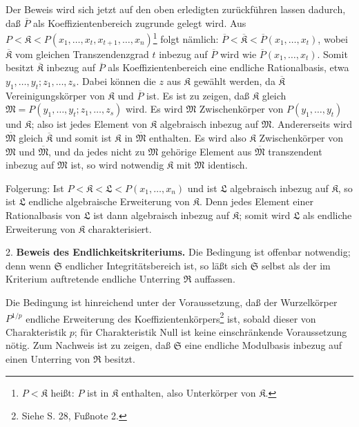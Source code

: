 Der Beweis wird sich jetzt auf den oben erledigten zurückführen lassen dadurch, daß $\overline P$ als Koeffizientenbereich zugrunde gelegt wird. Aus $P<\mathfrak K< P(x_1,\ldots,x_t,x_{t+1},\ldots,x_n)$\footnote{$P<\mathfrak K$ heißt: $P$ ist in $\mathfrak K$ enthalten, also Unterkörper von $\mathfrak K$.} folgt nämlich: $\overline P<\overline{\mathfrak K}<\overline P(x_1,\ldots,x_t)$, wobei $\overline{\mathfrak K}$ vom gleichen Transzendenzgrad $t$ inbezug auf $\overline P$ wird wie $\overline P(x_1,\ldots,x_t)$. Somit besitzt $\overline{\mathfrak K}$ inbezug auf $\overline P$ als Koeffizientenbereich eine endliche Rationalbasis, etwa $y_1,\ldots,y_t; z_1,\ldots,z_s$. Dabei können die $z$ aus $\mathfrak K$ gewählt werden, da $\overline{\mathfrak K}$ Vereinigungskörper von $\mathfrak K$ und $\overline P$ ist. Es ist zu zeigen, daß $\mathfrak K$ gleich $\mathfrak M=P(y_1,\ldots,y_t;z_1,\ldots,z_s)$ wird. Es wird $\mathfrak M$ Zwischenkörper von $P(y_1,\ldots,y_t)$ und $\mathfrak K$; also ist jedes Element von $\mathfrak K$ algebraisch inbezug auf $\mathfrak M$. Andererseits wird $\overline{\mathfrak M}$ gleich $\overline{\mathfrak K}$ und somit ist $\mathfrak K$ in $\overline{\mathfrak M}$ enthalten. Es wird also $\mathfrak K$ Zwischenkörper von $\mathfrak M$ und $\overline{\mathfrak M}$, und da jedes nicht zu $\mathfrak M$ gehörige Element aus $\overline{\mathfrak M}$ transzendent inbezug auf $\mathfrak M$ ist, so wird notwendig $\mathfrak K$ mit $\mathfrak M$ identisch.

Folgerung: Ist $P<\mathfrak K<\mathfrak L<P(x_1,\ldots,x_n)$ und ist $\mathfrak L$ algebraisch inbezug auf $\mathfrak K$, so ist $\mathfrak L$ endliche algebraische Erweiterung von $\mathfrak K$. Denn jedes Element einer Rationalbasis von $\mathfrak L$ ist dann algebraisch inbezug auf $\mathfrak K$; somit wird $\mathfrak L$ als endliche Erweiterung von $\mathfrak K$ charakterisiert.

2. \textbf{Beweis des Endlichkeitskriteriums.} Die Bedingung ist offenbar notwendig; denn wenn $\mathfrak S$ endlicher Integritätsbereich ist, so läßt sich $\mathfrak S$ selbst als der im Kriterium auftretende endliche Unterring $\mathfrak R$ auffassen.

Die Bedingung ist hinreichend unter der Voraussetzung, daß der Wurzelkörper $P^{1/p}$ endliche Erweiterung des Koeffizientenkörpers\footnote{Siehe S. 28, Fußnote 2.} ist, sobald dieser von Charakteristik $p$; für Charakteristik Null ist keine einschränkende Voraussetzung nötig. Zum Nachweis ist zu zeigen, daß $\mathfrak S$ eine endliche Modulbasis inbezug auf einen Unterring von $\mathfrak R$ besitzt.

